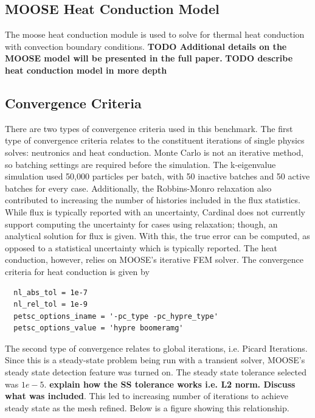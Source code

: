 \documentclass[letterpaper]{mc2023}
\begin{document}
\subsection{MOOSE Heat Conduction Model}
The \gls{moose} heat conduction module is used to solve for thermal heat conduction with convection boundary conditions.
\textbf{TODO Additional details on the MOOSE model will be presented in the full paper.}
\textbf{TODO describe heat conduction model in more depth}
\subsection{Convergence Criteria}
There are two types of convergence criteria used in this benchmark. The first type of convergence criteria relates to the
constituent iterations of single physics solves: neutronics and heat conduction. Monte Carlo is not an iterative method,
so batching settings are required before the simulation. The k-eigenvalue simulation used 50,000 particles per batch,
with 50 inactive batches and 50 active batches for every case. Additionally, the Robbins-Monro relaxation also contributed
to increasing the number of histories included in the flux statistics. While flux is typically reported with an uncertainty,
Cardinal does not currently support computing the uncertainty for cases using relaxation; though, an analytical solution for
flux is given. With this, the true error can be computed, as opposed to a statistical uncertainty which is typically reported.
The heat conduction, however, relies on MOOSE's iterative FEM solver. The convergence criteria for heat conduction is given by
\begin{lstlisting}
  nl_abs_tol = 1e-7
  nl_rel_tol = 1e-9
  petsc_options_iname = '-pc_type -pc_hypre_type'
  petsc_options_value = 'hypre boomeramg'
\end{lstlisting}

The second type of convergence relates to global iterations, i.e. Picard Iterations. Since this is a steady-state problem being
run with a transient solver, MOOSE's steady state detection feature was turned on. The steady state tolerance selected was $1e-5$.
\textbf{explain how the SS tolerance works i.e. L2 norm. Discuss what was included}. This led to increasing number of iterations
to achieve steady state as the mesh refined. Below is a figure showing this relationship.

\end{document}
